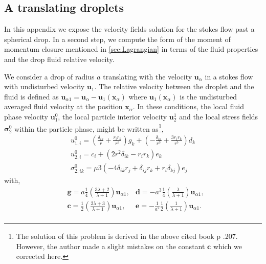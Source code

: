 \subsection*{A translating droplets}
\label{ap:Translating_sphere}





In this appendix we expose the velocity fields solution for the stokes flow past a spherical drop. 
In a second step, we compute the form of the moment of momentum closure mentioned in \ref{sec:Lagrangian} in terms of the fluid properties and the drop fluid relative velocity.

We consider a drop of radius $a$ translating with the velocity $\textbf{u}_\alpha$ in a stokes flow with undisturbed velocity $\textbf{u}_1$.
The relative velocity between the droplet and the fluid is defined as $\textbf{u}_{\alpha 1}= \textbf{u}_\alpha - \textbf{u}_1(\textbf{x}_\alpha)$ where $\textbf{u}_1(\textbf{x}_\alpha)$ is the undisturbed averaged fluid velocity at the position $\textbf{x}_\alpha$. 
In these conditions, the local fluid phase velocity $\textbf{u}_1^0$, the local particle interior velocity $\textbf{u}_2^1$ and the local stress fields $\bm\sigma_2^0$ within the particle phase, might be written as\citet{pozrikidis1992boundary}\footnote{The solution of this problem is derived in the above cited book p .207.  However, the author made a slight mistakes on the constant $\textbf{c}$ which we corrected here. }, 
\begin{align*}
    u_{1,i}^0
    = \left(\frac{\delta_{ik}}{r} + \frac{r_ir_k}{r^3}\right)  g_k
    + \left(-\frac{\delta_{ik}}{r^3} + \frac{3r_ir_k}{r^5}\right)  d_k\\
    u_{2,i}^0
    = c_i
    + \left(2 r^2 \delta_{ik} - r_ir_k\right) e_k\\
    \sigma_{2,ik}^0
    = \mu 3(
        - 4 \delta_{ik} r_j
        + \delta_{ij} r_k
        + r_i \delta_{kj}
    )e_j 
\end{align*}
with, 
\begin{align*}
    &\textbf{g} = a\frac{1}{4}\left(\frac{3\lambda + 2}{\lambda +1}\right) \textbf{u}_{\alpha 1},
    &\textbf{d} = -a^3\frac{1}{4}\left(\frac{\lambda}{\lambda +1}\right) \textbf{u}_{\alpha 1},\\
    &\textbf{c} = \frac{1}{2}\left(\frac{2\lambda + 3}{\lambda +1}\right) \textbf{u}_{\alpha 1},
    &\textbf{e} = -\frac{1}{a^2}\frac{1}{2}\left(\frac{1}{\lambda +1}\right)  \textbf{u}_{\alpha 1}.\\
\end{align*}

